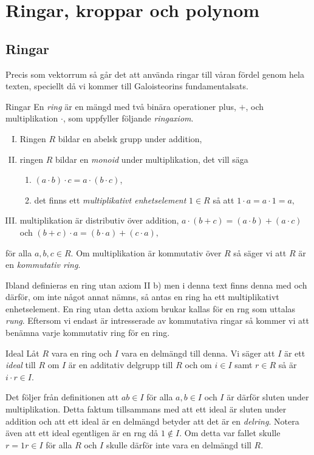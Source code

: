 \documentclass{article}
\theoremstyle{definition}
\begin{document}
\section{Ringar, kroppar och polynom}
\subsection{Ringar}
Precis som vektorrum så går det att använda ringar till våran fördel genom hela texten, speciellt då vi kommer till
Galoisteorins fundamentalsats.
\begin{mydef}{Ringar}{}
  En \textit{ring} är en mängd med två binära operationer plus, $+$, och multiplikation $\cdot$, som uppfyller följande \textit{ringaxiom}.
  \begin{enumerate}[I)]
    \item Ringen $R$ bildar en abelsk grupp under addition,
    \item ringen $R$ bildar en \textit{monoid} under multiplikation, det vill säga 
    \begin{enumerate}
      \item $(a \cdot b) \cdot c = a \cdot (b \cdot c)$,
      \item det finns ett \textit{multiplikativt enhetselement} $1 \in R$ så att $1 \cdot a = a \cdot 1 = a,$
    \end{enumerate}
    \item multiplikation är distributiv över addition, $a \cdot (b+c) = (a \cdot b) + (a \cdot c)$ och $(b + c) \cdot a = (b \cdot a) + (c \cdot a),$
  \end{enumerate}
  för alla $a, b, c \in R$. Om multiplikation är kommutativ över $R$ så säger vi att $R$ är en \textit{kommutativ ring}. 
\end{mydef}
Ibland definieras en ring utan axiom II b) men i denna text finns denna med och därför, om inte något annat nämns, så antas en ring ha ett multiplikativt enhetselement. 
En ring utan detta axiom brukar kallas för en rng som uttalas \textit{rung}. Eftersom vi endast är intresserade av kommutativa ringar så kommer vi 
att benämna varje kommutativ ring för en ring. 

\begin{mydef}{Ideal}{}
  Låt $R$ vara en ring och $I$ vara en delmängd till denna. Vi säger att $I$ är ett \textit{ideal} till $R$ om $I$ är en additativ delgrupp till $R$
  och om $i \in I$ samt $r \in R$ så är $i \cdot r \in I$. 
\end{mydef}
Det följer från definitionen att $ab \in I$ för alla $a, b \in I$ och $I$ är därför sluten under multiplikation. Detta faktum tillsammans 
med att ett ideal är sluten under addition och att ett ideal är en delmängd betyder att det är en \textit{delring}.
Notera även att ett ideal egentligen är en rng då $1 \notin I$. Om detta var fallet skulle 
$r = 1r \in I$ för alla $R$ och $I$ skulle därför inte vara en delmängd till $R$. 
\end{document}

